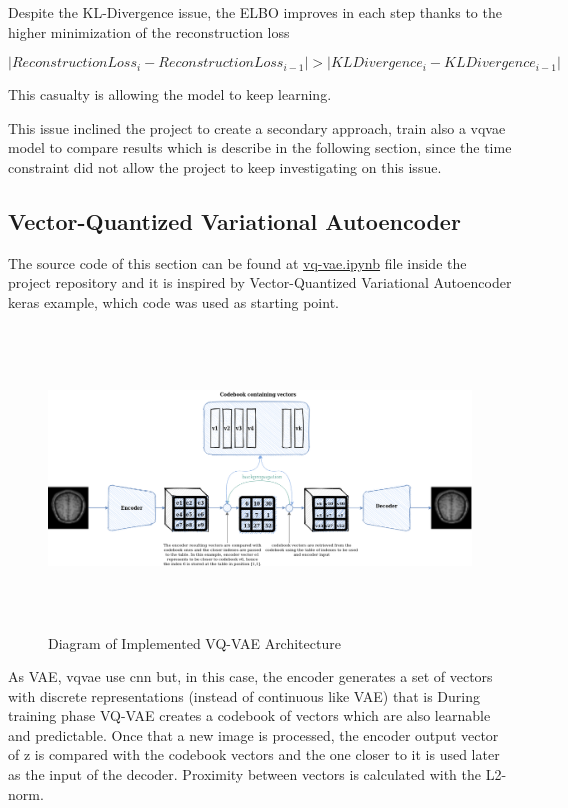Despite the KL-Divergence issue, the ELBO improves in each step thanks to the higher minimization of the reconstruction loss

\begin{equation}
    \left\lvert Reconstruction Loss_i - Reconstruction Loss_{i-1} \right\rvert > \left\lvert KL Divergence_i - KL Divergence_{i-1} \right\rvert
\end{equation}
 
This casualty is allowing the model to keep learning.

This issue inclined the project to create a secondary approach, train also a \acrshort*{vqvae} model to compare results which is describe in the following section, since the time constraint did not allow the project to keep investigating on this issue.

\subsection{Vector-Quantized Variational Autoencoder}

The source code of this section can be found at \href{https://github.com/mtablado/uoc2022_tfm/blob/main/vq-vae.ipynb}{vq-vae.ipynb} file inside the project repository and it is inspired by Vector-Quantized Variational Autoencoder \cite{vqvaekeras} keras example, which code was used as starting point.

\begin{figure}[ht]
    \centering
    \includegraphics[width = 16cm, height = 8cm]{images/vq-vae.png}
    \caption[]{Diagram of Implemented VQ-VAE Architecture}
    \label{fig:vqvaearch}
\end{figure}

As VAE, \acrshort*{vqvae} use \acrshort*{cnn} but, in this case, the encoder generates a set of vectors with discrete representations (instead of continuous like VAE)  that is 
During training phase VQ-VAE creates a codebook of vectors which are also learnable and predictable. Once that a new image is processed, the encoder output vector of z is compared with the codebook vectors and the one closer to it is used later as the input of the decoder. Proximity between vectors is calculated with the L2-norm.

